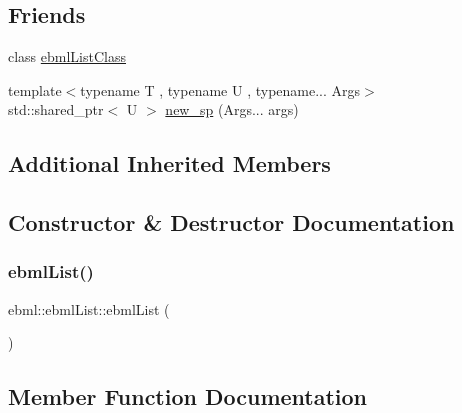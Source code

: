 \subsection*{Friends}
\begin{DoxyCompactItemize}
\item 
class \mbox{\hyperlink{classebml_1_1ebmlList_a97c631dff45f04b8ed9b303d6a9e03c5}{ebml\+List\+Class}}
\item 
{\footnotesize template$<$typename T , typename U , typename... Args$>$ }\\std\+::shared\+\_\+ptr$<$ U $>$ \mbox{\hyperlink{classebml_1_1ebmlList_ace404b6adc012cac5ccd9c03160456e3}{new\+\_\+sp}} (Args... args)
\end{DoxyCompactItemize}
\subsection*{Additional Inherited Members}


\subsection{Constructor \& Destructor Documentation}
\mbox{\label{classebml_1_1ebmlList_a8df16a98de7ff5cd9512840b908b1247}} 
\subsubsection{\texorpdfstring{ebml\+List()}{ebmlList()}}
{\footnotesize\ttfamily ebml\+::ebml\+List\+::ebml\+List (\begin{DoxyParamCaption}\item[{const \mbox{\hyperlink{classebml_1_1ebmlListClass}{ebml\+List\+Class}} $\ast$}]{ }\end{DoxyParamCaption})\hspace{0.3cm}{\ttfamily [protected]}}



\subsection{Member Function Documentation}
\mbox{\label{classebml_1_1ebmlList_aafcb7a3112a89b0bdde898b84ee44ec5}} 
